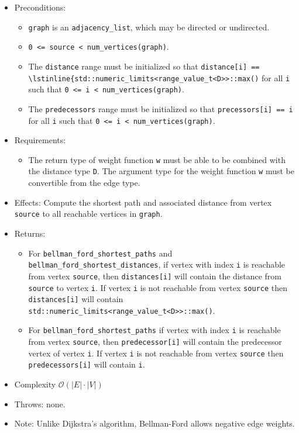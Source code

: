 \begin{itemize}
\item[] Preconditions:
\begin{itemize}
\item[]
\lstinline{graph} is an \lstinline{adjacency_list}, which may be directed or
undirected.
\item[]
\lstinline{0 <= source < num_vertices(graph)}.
\item[]
  The \lstinline{distance} range must be initialized so that 
  \lstinline{distance[i] ==  \lstinline{std::numeric_limits<range_value_t<D>>::max()} 
  for all \lstinline{i}
  such that \lstinline{0 <= i < num_vertices(graph)}.  
\item[]
  The \lstinline{predecessors} range must be initialized so that
  \lstinline{precessors[i] == i} for all \lstinline{i} such that 
  \lstinline{0 <= i < num_vertices(graph)}.
\end{itemize}
\item[] Requirements: 
\begin{itemize}
\item[]
The return type of weight function \lstinline{w} must be able to
  be combined with the distance type \lstinline{D}.  The argument type for the weight
  function \lstinline{w} must be convertible from the edge type.
\end{itemize}
\item[] 
Effects: Compute the shortest path and associated distance from vertex
\lstinline{source} to all reachable vertices in \lstinline{graph}.
\item[] 
Returns:
\begin{itemize}
\item[] For \lstinline{bellman_ford_shortest_paths} and \lstinline{bellman_ford_shortest_distances},
  if vertex with index \lstinline{i} is reachable from vertex \lstinline{source}, then
  \lstinline{distances[i]} will contain the distance from \lstinline{source} to vertex
  \lstinline{i}.  If vertex \lstinline{i} is not reachable from vertex
  \lstinline{source} then \lstinline{distances[i]} will contain
  \lstinline{std::numeric_limits<range_value_t<D>>::max()}.
\item[]
For \lstinline{bellman_ford_shortest_paths} if vertex with index \lstinline{i} is reachable
from vertex \lstinline{source}, then \lstinline{predecessor[i]} will contain the
predecessor vertex of vertex \lstinline{i}.  If vertex \lstinline{i} is not reachable
from vertex \lstinline{source} then \lstinline{predecessors[i]} will contain
\lstinline{i}.
\end{itemize}
%
\item[] Complexity $\mathcal{O}(|E| \cdot |V|)$ 
\item[] Throws: none. 
\item[] Note:  Unlike Dijkstra's algorithm, Bellman-Ford allows negative edge weights.
\end{itemize}


